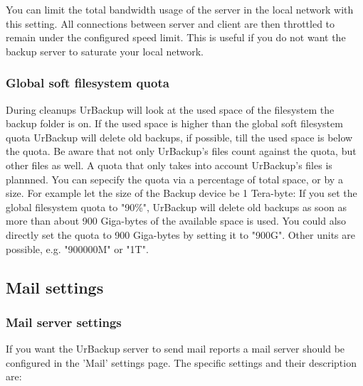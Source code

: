 \documentclass[a4paper,10pt]{article}
\begin{document}
You can limit the total bandwidth usage of the server in the local network
with this setting. All connections between server and client are then throttled
to remain under the configured speed limit. This is useful if you do not want
the backup server to saturate your local network. 

\subsubsection{Global soft filesystem quota}

During cleanups UrBackup will look at the used space of the filesystem the backup folder is on. If the used space is higher than the global soft filesystem quota UrBackup will delete old backups, if possible, till the used space is below the quota. Be aware that not only UrBackup's files count against the quota, but other files as well. A quota that only takes into account UrBackup's files is plannned.
You can sepecify the quota via a percentage of total space, or by a size. For example let the size of the Backup device be 1 Tera-byte:
If you set the global filesystem quota to "90\%", UrBackup will delete old backups as soon as more than about 900 Giga-bytes of the available space is used. You could also directly set the quota to 900 Giga-bytes by setting it to "900G". Other units are possible, e.g. "900000M" or "1T".

\subsection{Mail settings}

\subsubsection{Mail server settings}

If you want the UrBackup server to send mail reports a mail server should be configured in the 'Mail' settings page. The specific settings and their description are:
\end{document}
